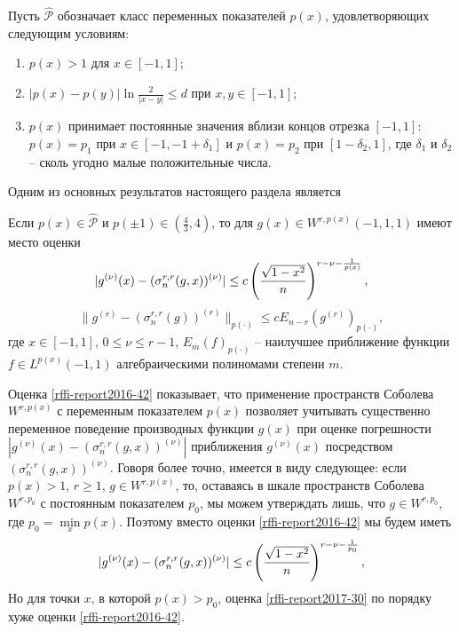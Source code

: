 Пусть $\mathcal{\hat P}$ обозначает класс переменных показателей $p(x)$, удовлетворяющих следующим условиям:
\begin{enumerate}[1)]
\item\label{rffi-report2017-p-cond-1}
$p(x)>1$ для $x\in[-1,1]$;
\item\label{rffi-report2017-p-cond-2}
$|p(x)-p(y)|\ln\frac{2}{|x-y|}\le d$ при $x,y\in[-1,1]$;
\item\label{rffi-report2017-p-cond-3}
$p(x)$  принимает постоянные значения вблизи концов отрезка $[-1,1]$: $p(x)=p_1$ при $x\in[-1,-1+\delta_1]$ и $p(x)=p_2$ при $[1-\delta_2, 1]$, где $\delta_1$ и $\delta_2$ -- сколь угодно малые положительные числа.
\end{enumerate}
Одним из основных результатов настоящего раздела является
\begin{theorem}\label{rffi-report2016-th5}
Если $p(x)\in \mathcal{\hat P}$ и $p(\pm1)\in (\frac43,4)$, то для $g(x)\in W^{r,p(x)}(-1,1,1)$ имеют место оценки
\begin{equation}\label{rffi-report2016-42}
|g^{(\nu)}(x)-(\sigma_n^{r,r}(g,x))^{(\nu)}|\le c\left({\sqrt{1-x^2}\over n}\right)^{r-\nu-\frac{1}{p(x)}} ,
\end{equation}
\begin{equation}\label{rffi-report2017-29}
\|g^{(r)}-(\sigma_n^{r,r}(g))^{(r)}\|_{p(\cdot)}\le cE_{n-r}(g^{(r)})_{p(\cdot)},
\end{equation}
где $ x\in[-1,1]$, $0\le\nu\le r-1$, $E_m(f)_{p(\cdot)}$ -- наилучшее приближение функции $f\in L^{p(x)}(-1,1) $ алгебраическими полиномами степени $m$.
\end{theorem}


Оценка \eqref{rffi-report2016-42} показывает, что применение пространств Соболева  $W^{r,p(x)}$ с переменным показателем $p(x)$ позволяет учитывать существенно переменное поведение производных функции  $g(x)$  при оценке погрешности $|g^{(\nu)}(x)-(\sigma_n^{r,r}(g,x))^{(\nu)}|$ приближения  $g^{(\nu)}(x)$ посредством \linebreak $(\sigma_n^{r,r}(g,x))^{(\nu)}$. Говоря более точно, имеется в виду следующее: если $p(x)>1$, $r\ge1$, $g\in W^{r,p(x)}$, то, оставаясь в шкале пространств Соболева $W^{r,p_0}$ с постоянным показателем $p_0$, мы можем утверждать лишь, что  $g\in W^{r,p_0}$, где $p_0=\min\limits_x p(x)$. Поэтому вместо оценки \eqref{rffi-report2016-42} мы будем иметь
\begin{equation}\label{rffi-report2017-30}
|g^{(\nu)}(x)-(\sigma_n^{r,r}(g,x))^{(\nu)}|\le c\left({\sqrt{1-x^2}\over n}\right)^{r-\nu-\frac{1}{p_0}} ,
\end{equation}
Но для точки $x$, в которой $p(x)>p_0$, оценка \eqref{rffi-report2017-30}  по порядку хуже оценки \eqref{rffi-report2016-42}.


